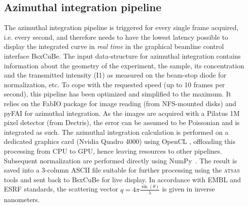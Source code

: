 \documentclass[preprint,pdf]{iucr}              %
\begin{document}
\subsection{Azimuthal integration pipeline}
\label{AI}
The azimuthal integration pipeline is triggered for every single frame acquired, i.e. every second,
and therefore needs to have the lowest latency possible to display the integrated curve
in \textit{real time} in the graphical beamline control interface BsxCuBe.
The input data-structure for azimuthal integration contains
information about the geometry of the experiment, the sample, its concentration
and the transmitted intensity (I1) as measured on the beam-stop diode for
normalization, etc.
To cope with the requested speed (up to 10 frames per second), this pipeline
has been optimized and simplified to the maximum.
It relies on the FabIO \cite{fabio} package for image reading (from NFS-mounted
disks) and pyFAI \cite{pyFAI} for azimuthal integration.
As the images are acquired with a Pilatus 1M pixel detector (from Dectris), the
error can be assumed to be Poissonian and is integrated as such.
The azimuthal integration calculation is performed on a dedicated graphics card
(Nvidia Quadro 4000) using OpenCL \cite{pyFAI_gpu}, offloading this processing
from CPU to GPU, hence leaving resources to other pipelines.
Subsequent normalization are performed directly using NumPy~\cite{numpy}.
The result is saved into a 3-column ASCII file suitable for further processing
using the \textsc{atsas} tools \cite{ATSAS2} and sent back to BsxCuBe for
live display.
In accordance with EMBL and ESRF standards, the scattering vector
$q=4\pi\frac{\sin(\theta)}{\lambda}$ is given in inverse nanometers.
\end{document}
